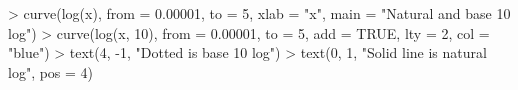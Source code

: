 \begin{Schunk}
\begin{Sinput}
> curve(log(x), from = 0.00001, to = 5, xlab = "x", main = "Natural and base 10 log")
> curve(log(x, 10), from = 0.00001, to = 5, add = TRUE, lty = 2, col = "blue")
> text(4, -1, "Dotted is base 10 log")
> text(0, 1, "Solid line is natural log", pos = 4)
\end{Sinput}
\end{Schunk}
